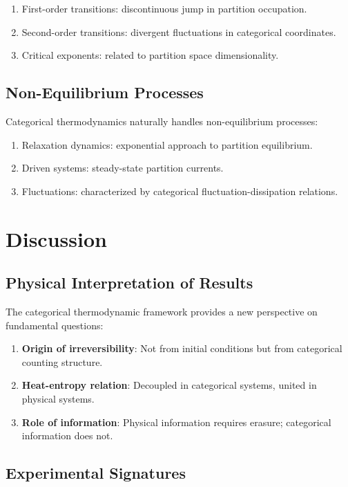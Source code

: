 \begin{enumerate}
    \item First-order transitions: discontinuous jump in partition occupation.
    \item Second-order transitions: divergent fluctuations in categorical coordinates.
    \item Critical exponents: related to partition space dimensionality.
\end{enumerate}

\subsection{Non-Equilibrium Processes}

Categorical thermodynamics naturally handles non-equilibrium processes:

\begin{enumerate}
    \item Relaxation dynamics: exponential approach to partition equilibrium.
    \item Driven systems: steady-state partition currents.
    \item Fluctuations: characterized by categorical fluctuation-dissipation relations.
\end{enumerate}

\section{Discussion}

\subsection{Physical Interpretation of Results}

The categorical thermodynamic framework provides a new perspective on fundamental questions:

\begin{enumerate}
    \item \textbf{Origin of irreversibility}: Not from initial conditions but from categorical counting structure.
    \item \textbf{Heat-entropy relation}: Decoupled in categorical systems, united in physical systems.
    \item \textbf{Role of information}: Physical information requires erasure; categorical information does not.
\end{enumerate}

\subsection{Experimental Signatures}

